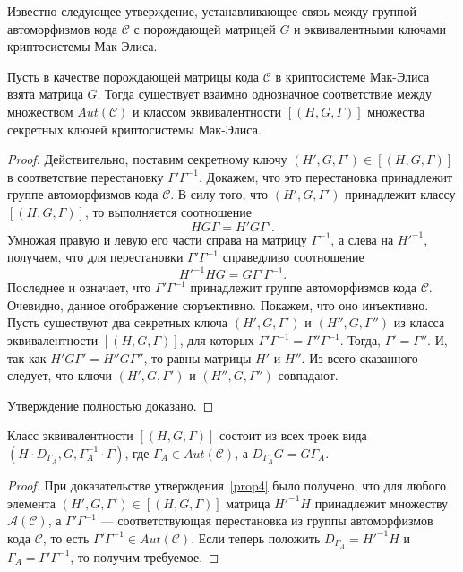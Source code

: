 Известно следующее утверждение, устанавливающее связь между
группой автоморфизмов кода $\mathcal C$ с порождающей матрицей $G$
и эквивалентными ключами криптосистемы Мак-Элиса.
\begin{proposition}\label{prop4}
Пусть в качестве порождающей матрицы кода $\mathcal C$ в
криптосистеме Мак-Элиса взята матрица $G$. Тогда существует
взаимно однозначное соответствие между множеством $Aut(\mathcal
C)$ и классом эквивалентности $[(H,G,\Gamma)]$ множества секретных
ключей криптосистемы Мак-Элиса.
\end{proposition}
\begin{proof}
Действительно, поставим секретному ключу
$(H',G,\Gamma')\in [(H,G,\Gamma)]$ в соответствие перестановку
$\Gamma'\Gamma^{-1}$. Докажем, что это перестановка принадлежит
группе автоморфизмов кода $\mathcal C$. В силу того, что
$(H',G,\Gamma')$ принадлежит классу $[(H,G,\Gamma)]$, то
выполняется соотношение
$$
HG\Gamma=H'G\Gamma'.
$$
Умножая правую и левую его части справа на матрицу $\Gamma^{-1}$, а
слева на $H'^{-1}$, получаем, что для перестановки
$\Gamma'\Gamma^{-1}$ справедливо соотношение
$$
H'^{-1}HG=G\Gamma'\Gamma^{-1}.
$$
Последнее и означает, что $\Gamma'\Gamma^{-1}$ принадлежит группе
автоморфизмов кода $\mathcal C$. Очевидно, данное  отображение
сюръективно. Покажем, что оно инъективно. Пусть существуют два
секретных ключа $(H',G,\Gamma')$ и  $(H'',G,\Gamma'')$ из класса
эквивалентности $[(H,G,\Gamma)]$, для которых
$\Gamma'\Gamma^{-1}=\Gamma''\Gamma^{-1}$. Тогда,
$\Gamma'=\Gamma''$. И, так как $H'G\Gamma'=H''G\Gamma''$, то равны
матрицы $H'$ и $H''$. Из всего сказанного следует, что ключи
$(H',G,\Gamma')$ и $(H'',G,\Gamma'')$ совпадают.

Утверждение полностью доказано.
\end{proof}

\begin{proposition}
Класс эквивалентности $[(H,G,\Gamma)]$ состоит из всех троек вида
$(H\cdot D_{\Gamma_A},G,\Gamma^{-1}_A\cdot \Gamma)$, где
$\Gamma_A\in Aut(\mathcal C)$, а $D_{\Gamma_A}G=G\Gamma_A$.
\end{proposition}
\begin{proof}
При доказательстве утверждения~\ref{prop4} было получено, что для
любого элемента $(H',G,\Gamma')\in[(H,G,\Gamma)]$ матрица
$H'^{-1}H$ принадлежит множеству $\mathcal A(\mathcal C)$, а
$\Gamma'\Gamma^{-1}$ --- соответствующая перестановка из группы
автоморфизмов кода $\mathcal C$, то есть $\Gamma'\Gamma^{-1}\in
Aut(\mathcal C)$. Если теперь положить $D_{\Gamma_A}=H'^{-1}H$ и
$\Gamma_A=\Gamma'\Gamma^{-1}$, то получим требуемое.
\end{proof}


